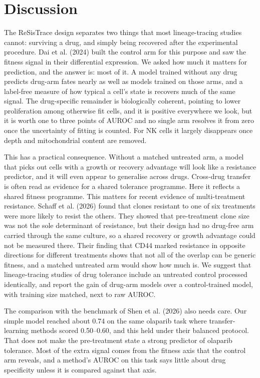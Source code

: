 \documentclass[11pt,a4paper]{article}
\begin{document}
\section*{Discussion}

The ReSisTrace design separates two things that most lineage-tracing studies cannot: surviving a drug, and simply being recovered after the experimental procedure. Dai et al. (2024) built the control arm for this purpose and saw the fitness signal in their differential expression. We asked how much it matters for prediction, and the answer is: most of it. A model trained without any drug predicts drug-arm fates nearly as well as models trained on those arms, and a label-free measure of how typical a cell's state is recovers much of the same signal. The drug-specific remainder is biologically coherent, pointing to lower proliferation among otherwise fit cells, and it is positive everywhere we look, but it is worth one to three points of AUROC and no single arm resolves it from zero once the uncertainty of fitting is counted. For NK cells it largely disappears once depth and mitochondrial content are removed.

This has a practical consequence. Without a matched untreated arm, a model that picks out cells with a growth or recovery advantage will look like a resistance predictor, and it will even appear to generalise across drugs. Cross-drug transfer is often read as evidence for a shared tolerance programme. Here it reflects a shared fitness programme. This matters for recent evidence of multi-treatment resistance. Schaff et al. (2026) found that clones resistant to one of six treatments were more likely to resist the others. They showed that pre-treatment clone size was not the sole determinant of resistance, but their design had no drug-free arm carried through the same culture, so a shared recovery or growth advantage could not be measured there. Their finding that CD44 marked resistance in opposite directions for different treatments shows that not all of the overlap can be generic fitness, and a matched untreated arm would show how much is. We suggest that lineage-tracing studies of drug tolerance include an untreated control processed identically, and report the gain of drug-arm models over a control-trained model, with training size matched, next to raw AUROC.

The comparison with the benchmark of Shen et al. (2026) also needs care. Our simple model reached about 0.74 on the same olaparib task where transfer-learning methods scored 0.50--0.60, and this held under their balanced protocol. That does not make the pre-treatment state a strong predictor of olaparib tolerance. Most of the extra signal comes from the fitness axis that the control arm reveals, and a method's AUROC on this task says little about drug specificity unless it is compared against that axis.
\end{document}
